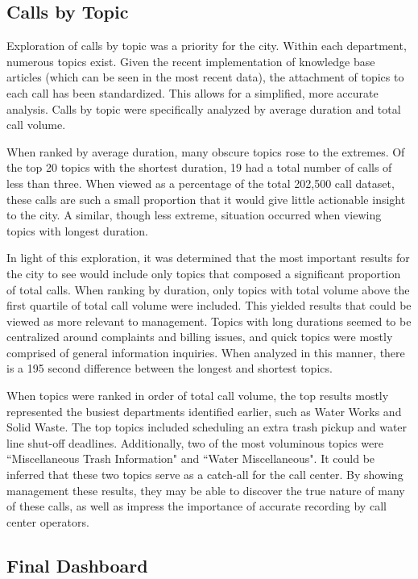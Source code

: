 \documentclass{article}
\begin{document}
	\subsection{Calls by Topic}

Exploration of calls by topic was a priority for the city.  Within each department, numerous topics exist.  Given the recent implementation of knowledge base articles (which can be seen in the most recent data), the attachment of topics to each call has been standardized.  This allows for a simplified, more accurate analysis.  Calls by topic were specifically analyzed by average duration and total call volume.
\par
When ranked by average duration, many obscure topics rose to the extremes.  Of the top 20 topics with the shortest duration, 19 had a total number of calls of less than three.  When viewed as a percentage of the total 202,500 call dataset, these calls are such a small proportion that it would give little actionable insight to the city.  A similar, though less extreme, situation occurred when viewing topics with longest duration.
\par
In light of this exploration, it was determined that the most important results for the city to see would include only topics that composed a significant proportion of total calls.  When ranking by duration, only topics with total volume above the first quartile of total call volume were included.  This yielded results that could be viewed as more relevant to management.  Topics with long durations seemed to be centralized around complaints and billing issues, and quick topics were mostly comprised of general information inquiries.  When analyzed in this manner, there is a 195 second difference between the longest and shortest topics.
\par
When topics were ranked in order of total call volume, the top results mostly represented the busiest departments identified earlier, such as Water Works and Solid Waste. The top topics included scheduling an extra trash pickup and water line shut-off deadlines.  Additionally, two of the most voluminous topics were ``Miscellaneous Trash Information" and ``Water Miscellaneous".  It could be inferred that these two topics serve as a catch-all for the call center.  By showing management these results, they may be able to discover the true nature of many of these calls, as well as impress the importance of accurate recording by call center operators.

	\subsection{Final Dashboard}
\end{document}
